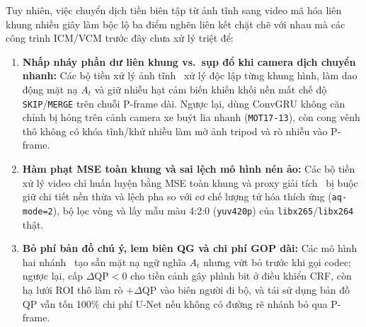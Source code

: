 \documentclass[journal]{IEEEtran}
\begin{document}
Tuy nhiên, việc chuyển dịch tiền biên tập từ ảnh tĩnh sang video mã hóa liên khung nhiều giây làm bộc lộ ba điểm nghẽn liên kết chặt chẽ với nhau mà các công trình ICM/VCM trước đây chưa xử lý triệt để:
\begin{enumerate}
    \item \textbf{Nhấp nháy phần dư liên khung vs.\ sụp đổ khi camera dịch chuyển nhanh:} Các bộ tiền xử lý ảnh tĩnh~\cite{lu2024preprocessing, yang2024task, dani2026scope} xử lý độc lập từng khung hình, làm dao động mặt nạ $A_t$ và giữ nhiễu hạt cảm biến khiến khối nền mất chế độ \texttt{SKIP}/\texttt{MERGE} trên chuỗi P-frame dài. Ngược lại, dùng ConvGRU không căn chỉnh bị hỏng trên cảnh camera xe buýt lia nhanh (\texttt{MOT17-13}), còn cong vênh thô không có khóa tĩnh/khử nhiễu làm mờ ảnh tripod và rò nhiễu vào P-frame.
    \item \textbf{Hàm phạt MSE toàn khung và sai lệch mô hình nén ảo:} Các bộ tiền xử lý video chỉ huấn luyện bằng MSE toàn khung và proxy giải tích~\cite{zhao2024preprocessing} bị buộc giữ chi tiết nền thừa và lệch pha so với cơ chế lượng tử hóa thích ứng (\texttt{aq-mode=2}), bộ lọc vòng và lấy mẫu màu 4:2:0 (\texttt{yuv420p}) của \texttt{libx265}/\texttt{libx264} thật.
    \item \textbf{Bỏ phí bản đồ chú ý, lem biên QG và chi phí GOP dài:} Các mô hình hai nhánh~\cite{dani2026scope} tạo sẵn mặt nạ ngữ nghĩa $A_t$ nhưng vứt bỏ trước khi gọi codec; ngược lại, cấp $\Delta\mathrm{QP}<0$ cho tiền cảnh gây phình bit ở điều khiển CRF, còn hạ lưới ROI thô làm rò $+\Delta\mathrm{QP}$ vào biên người đi bộ, và tái sử dụng bản đồ QP vẫn tốn 100\% chi phí U-Net nếu không có đường rẽ nhánh bỏ qua P-frame.
\end{enumerate}
\end{document}
